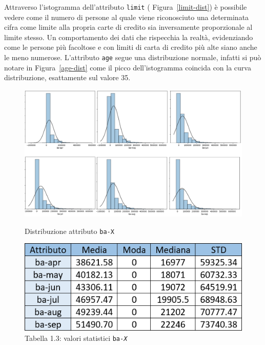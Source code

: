 Attraverso l'istogramma dell'attributo \texttt{limit} ( Figura~\ref{limit-dist}) \`e possibile vedere come il numero di persone al quale viene riconosciuto una determinata cifra come limite alla propria carte di credito sia inversamente proporzionale al limite stesso. Un comportamento dei dati che rispecchia la realt\`a, evidenziando come le persone pi\`u facoltose e con limiti di carta di credito pi\`u alte siano anche le meno numerose. L'attributo \texttt{age} segue una distribuzione normale, infatti si pu\`o notare in Figura~\ref{age-dist} come il picco dell'istogramma coincida con la curva distribuzione, esattamente sul valore 35.

\begin{figure}[!htb]
  \includegraphics[width=\linewidth]{img/ba-distribution.png}
  \caption{Distribuzione attributo \texttt{ba-X}}\label{ba-dist}
\endminipage\hfill
{}
  \includegraphics[width=\linewidth]{img/ba-stat.png}
\captionsetup{labelformat=empty}
\caption{Tabella 1.3: valori statistici \texttt{ba-\textit{X}}}
\label{ba-stat}
\endminipage\hfill
\end{figure}

